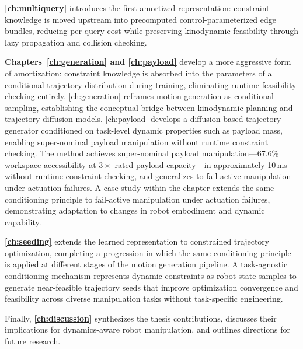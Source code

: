\textbf{\cref{ch:multiquery}} introduces the first amortized representation: constraint knowledge is moved upstream into precomputed control-parameterized edge bundles, reducing per-query cost while preserving kinodynamic feasibility through lazy propagation and collision checking.

\textbf{Chapters~\ref{ch:generation} and \ref{ch:payload}} develop a more aggressive form of amortization: constraint knowledge is absorbed into the parameters of a conditional trajectory distribution during training, eliminating runtime feasibility checking entirely.
\cref{ch:generation} reframes motion generation as conditional sampling, establishing the conceptual bridge between kinodynamic planning and trajectory diffusion models.
\cref{ch:payload} develops a diffusion-based trajectory generator conditioned on task-level dynamic properties such as payload mass, enabling super-nominal payload manipulation without runtime constraint checking. The method achieves super-nominal payload manipulation---67.6\% workspace accessibility at $3\times$ rated payload capacity---in approximately 10\,ms without runtime constraint checking, and generalizes to fail-active manipulation under actuation failures.
A case study within the chapter extends the same conditioning principle to fail-active manipulation under actuation failures, demonstrating adaptation to changes in robot embodiment and dynamic capability.

\textbf{\cref{ch:seeding}} extends the learned representation to constrained trajectory optimization, completing a progression in which the same conditioning principle is applied at different stages of the motion generation pipeline.
A task-agnostic conditioning mechanism represents dynamic constraints as robot state samples to generate near-feasible trajectory seeds that improve optimization convergence and feasibility across diverse manipulation tasks without task-specific engineering.

Finally, \textbf{\cref{ch:discussion}} synthesizes the thesis contributions, discusses their implications for dynamics-aware robot manipulation, and outlines directions for future research.

